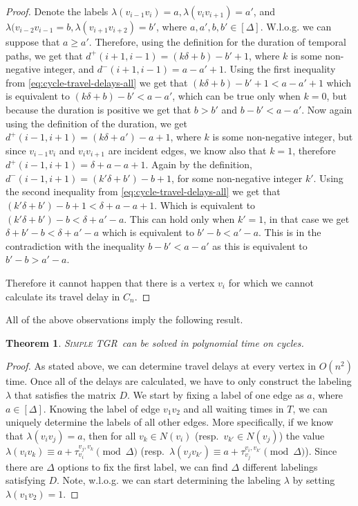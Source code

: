 \documentclass[11pt,a4paper]{article}
\newtheorem{theorem}{Theorem}
\theoremstyle{remark}
\theoremstyle{definition}
\newcommand{\deltaExact}{\textsc{Simple TGR}}
\begin{document}
\begin{proof}
    Denote the labels $\lambda(v_{i-1}v_i) = a, \lambda(v_{i}v_{i+1})=a'$, and $\lambda(v_{i-2}v_{i-1} = b, \lambda (v_{i+1}v_{i+2})=b'$, where $a,a',b,b' \in [\Delta]$.
    W.l.o.g. we can suppose that $a \geq a'$.
    Therefore, using the definition for the duration of temporal paths, we get that
    $d^+(i+1,i-1) = (k \delta + b) - b' + 1$, where $k$ is some non-negative integer, and $d^-(i+1,i-1) = a - a' + 1$.
    Using the first inequality from \cref{eq:cycle-travel-delays-all} we get that 
    $(k \delta + b) - b' +1 < a - a' + 1$ which is equivalent to $(k \delta + b) - b' < a - a'$, which can be true only when $k = 0$, but because the duration is positive we get that $b > b'$ and
    $b - b' < a - a'$.
    Now again using the definition of the duration, we get
    $d^+(i-1,i+1)= (k\delta + a') - a + 1$, where $k$ is some non-negative integer, but since $v_{i-1}v_i$ and $v_iv_{i+1}$ are incident edges, we know also that $k=1$, therefore $d^+(i-1,i+1)= \delta + a - a + 1$. 
    Again by the definition, $d^-(i-1,i+1) = (k' \delta + b') -b + 1$, for some non-negative integer $k'$.
    Using the second inequality from \cref{eq:cycle-travel-delays-all} we get that 
    $(k' \delta + b') -b + 1 < \delta + a - a + 1$.
    Which is equivalent to  $(k' \delta + b') -b < \delta + a' - a $. This can hold only when $k' = 1$, in that case we get $ \delta + b' -b < \delta + a' - a $ which is equivalent to $b' -b < a' - a$.
    This is in the contradiction with the inequality  $b - b' < a - a'$ as this is equivalent to $b'-b > a'-a$.
    
    Therefore it cannot happen that there is a vertex $v_i$ for which we cannot calculate its travel delay in $C_n$.
\end{proof}

All of the above observations imply the following result.
\begin{theorem}
    \deltaExact\ can be solved in polynomial time on cycles.
\end{theorem}

\begin{proof}
As stated above, we can determine travel delays at every vertex in $O(n^2)$ time. 
Once all of the delays are calculated, we have to only construct the labeling $\lambda$ that satisfies the matrix $D$. 
We start by fixing a label of one edge as $a$, where $a \in [\Delta]$.
Knowing the label of edge $v_1v_2$ and all waiting times in $T$, we can uniquely determine the labels of all other edges.
More specifically, if we know that $\lambda(v_i v_j) = a$, then for all $v_k \in N(v_i)$ (resp.~$v_{k'} \in N(v_j)$)
the value $\lambda(v_iv_k) \equiv a + \tau_{v_i}^{v_j,v_k} \pmod \Delta $ (resp.~$\lambda(v_j v_{k'}) \equiv a + \tau_{v_j}^{v_i,v_{k'}} \pmod \Delta $).
Since there are $\Delta$ options to fix the first label, we can find $\Delta$ different labelings satisfying $D$.
Note, w.l.o.g. we can start determining the labeling $\lambda$ by setting $\lambda(v_1v_2) = 1$.
\end{proof}
\end{document}
